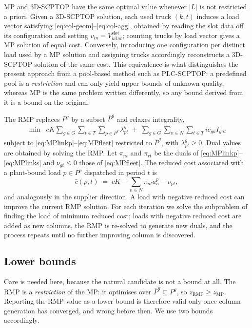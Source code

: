 MP and 3D-SCPTOP have the same optimal value whenever $|L|$ is not
restricted a priori. Given a 3D-SCPTOP solution, each used truck
$(k,t)$ induces a load vector satisfying
\eqref{eq:col-geom}--\eqref{eq:col-agg}, obtained by reading the slot
data off its configuration and setting
$v_{in}=V^{\mathrm{slot}}_{kilnt}$; counting trucks by load vector
gives a MP solution of equal cost. Conversely, introducing one
configuration per distinct load used by a MP solution and assigning
trucks accordingly reconstructs a 3D-SCPTOP solution of the same
cost. This equivalence is what distinguishes the present approach
from a pool-based method such as PLC-SCPTOP: a predefined pool is a
\emph{restriction} and can only yield upper bounds of unknown
quality, whereas MP is the same problem written differently, so any
bound derived from it is a bound on the original.

The RMP replaces $P^{g}$ by a subset $\bar P^{g}$ and relaxes
integrality,
\begin{align}
    \min\;\; cK \sum_{g\in G}\sum_{t\in T}\sum_{p\in \bar P^{g}}\lambda^{g}_{pt}
    \;+\;\sum_{g\in G}\sum_{n\in N}\sum_{t\in T} ic_{gn} I_{gnt}
    \label{eq:RMPObjective}
\end{align}
subject to \eqref{eq:MPlinkp}--\eqref{eq:MPfleet} restricted to
$\bar P^{g}$, with $\lambda^{g}_{pt}\ge0$. Dual values are obtained
by solving the RMP. Let $\pi_{nt}$ and $\pi_{rt}$ be the duals of
\eqref{eq:MPlinkp}--\eqref{eq:MPlinks} and $\nu_{gt}\le0$ those of
\eqref{eq:MPfleet}. The reduced cost associated with a plant-bound
load $p\in P^{p}$ dispatched in period $t$ is
\begin{equation}
\bar c(p,t)\;=\;cK-\sum_{n\in N}\pi_{nt}a^{p}_{n}-\nu_{pt},
\label{eq:redcost}
\end{equation}
and analogously in the supplier direction. A load with negative
reduced cost can improve the current RMP solution. For each iteration
we solve the subproblem of finding the load of minimum reduced cost;
loads with negative reduced cost are added as new columns, the RMP is
re-solved to generate new duals, and the process repeats until no
further improving column is discovered.



\subsection{Lower bounds}
\label{sec:bounds}

Care is needed here, because the natural candidate is not a bound at
all. The RMP is a \emph{restriction} of the MP: it optimises over
$\bar P^{g}\subseteq P^{g}$, so
$z_{\mathrm{RMP}}\ge z_{\mathrm{MP}}$. Reporting the RMP value as a
lower bound is therefore valid only once column generation has
converged, and wrong before then. We use two bounds accordingly.

